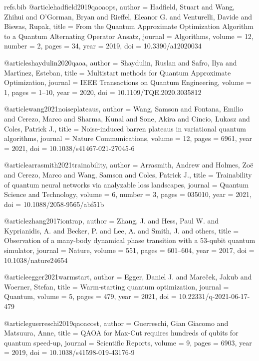 \begin{filecontents*}{refs.bib}
@article{hadfield2019qaoaops,
  author  = {Hadfield, Stuart and Wang, Zhihui and O'Gorman, Bryan and Rieffel, Eleanor G. and Venturelli, Davide and Biswas, Rupak},
  title   = {From the Quantum Approximate Optimization Algorithm to a Quantum Alternating Operator Ansatz},
  journal = {Algorithms},
  volume  = {12},
  number  = {2},
  pages   = {34},
  year    = {2019},
  doi     = {10.3390/a12020034}
}

@article{shaydulin2020qaoa,
  author  = {Shaydulin, Ruslan and Safro, Ilya and Mart{\'\i}nez, Esteban},
  title   = {Multistart methods for Quantum Approximate Optimization},
  journal = {IEEE Transactions on Quantum Engineering},
  volume  = {1},
  pages   = {1--10},
  year    = {2020},
  doi     = {10.1109/TQE.2020.3035812}
}

@article{wang2021noiseplateaus,
  author  = {Wang, Samson and Fontana, Emilio and Cerezo, Marco and Sharma, Kunal and Sone, Akira and Cincio, Lukasz and Coles, Patrick J.},
  title   = {Noise-induced barren plateaus in variational quantum algorithms},
  journal = {Nature Communications},
  volume  = {12},
  pages   = {6961},
  year    = {2021},
  doi     = {10.1038/s41467-021-27045-6}
}

@article{arrasmith2021trainability,
  author  = {Arrasmith, Andrew and Holmes, Zo{\"e} and Cerezo, Marco and Wang, Samson and Coles, Patrick J.},
  title   = {Trainability of quantum neural networks via analyzable loss landscapes},
  journal = {Quantum Science and Technology},
  volume  = {6},
  number  = {3},
  pages   = {035010},
  year    = {2021},
  doi     = {10.1088/2058-9565/abf51b}
}

@article{zhang2017iontrap,
  author  = {Zhang, J. and Hess, Paul W. and Kyprianidis, A. and Becker, P. and Lee, A. and Smith, J. and others},
  title   = {Observation of a many-body dynamical phase transition with a 53-qubit quantum simulator},
  journal = {Nature},
  volume  = {551},
  pages   = {601--604},
  year    = {2017},
  doi     = {10.1038/nature24654}
}

@article{egger2021warmstart,
  author  = {Egger, Daniel J. and Mare{\v{c}}ek, Jakub and Woerner, Stefan},
  title   = {Warm-starting quantum optimization},
  journal = {Quantum},
  volume  = {5},
  pages   = {479},
  year    = {2021},
  doi     = {10.22331/q-2021-06-17-479}
}

@article{guerreschi2019qaoacost,
  author  = {Guerreschi, Gian Giacomo and Matsuura, Anne},
  title   = {QAOA for Max-Cut requires hundreds of qubits for quantum speed-up},
  journal = {Scientific Reports},
  volume  = {9},
  pages   = {6903},
  year    = {2019},
  doi     = {10.1038/s41598-019-43176-9}
}


\end{filecontents*}
